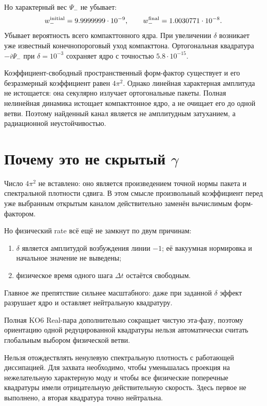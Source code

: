 Но характерный вес $\Psi_-$ не убывает:
\begin{equation}
 w_-^{\rm initial}=9.9999999\cdot10^{-9},
 \qquad
 w_-^{\rm final}=1.0030771\cdot10^{-8}.
\end{equation}
Убывает вероятность всего компакттонного ядра. При увеличении
$\delta$ возникает уже известный конечнопороговый уход компакттона.
Ортогональная квадратура $-i\Psi_-$ при $\delta=10^{-3}$ сохраняет ядро
с точностью $5.8\cdot10^{-15}$.

\begin{theorem}
Коэффициент-свободный пространственный форм-фактор существует и его
безразмерный коэффициент равен $4\pi^2$. Однако линейная характерная
амплитуда не истощается: она секулярно излучает ортогональные пакеты.
Полная нелинейная динамика истощает компакттонное ядро, а не очищает его
до одной ветви. Поэтому найденный канал является не амплитудным
затуханием, а радиационной неустойчивостью.
\end{theorem}

\section{Почему это не скрытый \texorpdfstring{$\gamma$}{gamma}}

Число $4\pi^2$ не вставлено: оно является произведением точной нормы
пакета и спектральной плотности сдвига. В этом смысле произвольный
коэффициент перед уже выбранным открытым каналом действительно заменён
вычислимым форм-фактором.

Но физический rate всё ещё не замкнут по двум причинам:
\begin{enumerate}
 \item $\delta$ является амплитудой возбуждения линии $-1$; её вакуумная
 нормировка и начальное значение не выведены;
 \item физическое время одного шага $\Delta t$ остаётся свободным.
\end{enumerate}
Главное же препятствие сильнее масштабного: даже при заданной $\delta$
эффект разрушает ядро и оставляет нейтральную квадратуру.

Полная KO6 Real-пара дополнительно сокращает чистую эта-фазу, поэтому
ориентацию одной редуцированной квадратуры нельзя автоматически считать
глобальным выбором физической ветви.

\begin{nogocriterion}
Нельзя отождествлять ненулевую спектральную плотность с работающей
диссипацией. Для захвата необходимо, чтобы уменьшалась проекция на
нежелательную характерную моду и чтобы все физические поперечные
квадратуры имели отрицательную действительную скорость. Здесь первое не
выполнено, а вторая квадратура точно нейтральна.
\end{nogocriterion}

